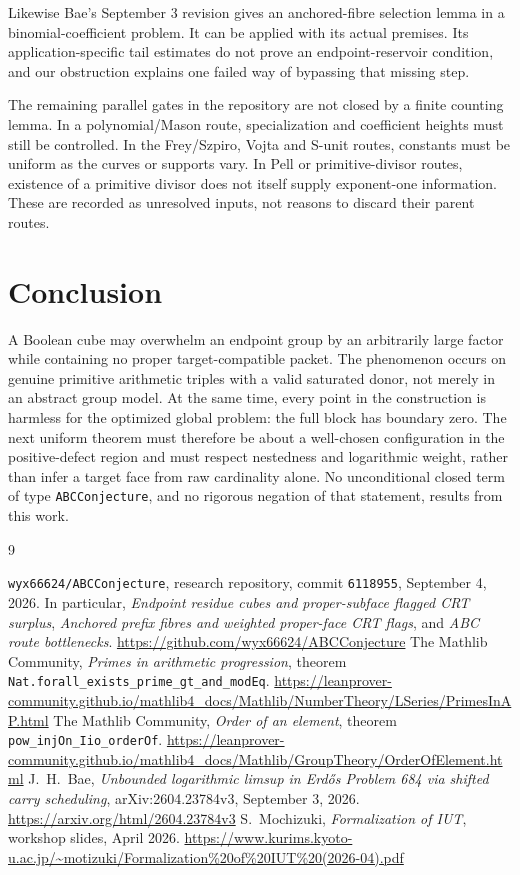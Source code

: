 \documentclass[11pt,a4paper]{article}
\theoremstyle{definition}
\theoremstyle{remark}
\begin{document}
Likewise Bae's September 3 revision \cite{bae} gives an anchored-fibre
selection lemma in a binomial-coefficient problem. It can be applied with
its actual premises. Its application-specific tail estimates do not prove
an endpoint-reservoir condition, and our obstruction explains one failed
way of bypassing that missing step.

The remaining parallel gates in the repository are not closed by a finite
counting lemma. In a polynomial/Mason route, specialization and coefficient
heights must still be controlled. In the Frey/Szpiro, Vojta and S-unit routes,
constants must be uniform as the curves or supports vary. In Pell or
primitive-divisor routes, existence of a primitive divisor does not itself
supply exponent-one information. These are recorded as unresolved inputs,
not reasons to discard their parent routes.

\section{Conclusion}
A Boolean cube may overwhelm an endpoint group by an arbitrarily large
factor while containing no proper target-compatible packet. The phenomenon
occurs on genuine primitive arithmetic triples with a valid saturated donor,
not merely in an abstract group model. At the same time, every point in the
construction is harmless for the optimized global problem: the full block
has boundary zero. The next uniform theorem must therefore be about a
well-chosen configuration in the positive-defect region and must respect
nestedness and logarithmic weight, rather than infer a target face from raw
cardinality alone. No unconditional closed term of type
\texttt{ABCConjecture}, and no rigorous negation of that statement, results
from this work.

\begin{thebibliography}{9}
\raggedright
{} \texttt{wyx66624/ABCConjecture}, research repository,
commit \texttt{6118955}, September 4, 2026.
In particular, \emph{Endpoint residue cubes and proper-subface flagged CRT
surplus}, \emph{Anchored prefix fibres and weighted proper-face CRT flags},
and \emph{ABC route bottlenecks}.\newline
\url{https://github.com/wyx66624/ABCConjecture}
 The Mathlib Community, \emph{Primes in arithmetic
progression}, theorem \texttt{Nat.forall\_exists\_prime\_gt\_and\_modEq}.
\url{https://leanprover-community.github.io/mathlib4_docs/Mathlib/NumberTheory/LSeries/PrimesInAP.html}
 The Mathlib Community, \emph{Order of an element}, theorem
\texttt{pow\_injOn\_Iio\_orderOf}.
\url{https://leanprover-community.github.io/mathlib4_docs/Mathlib/GroupTheory/OrderOfElement.html}
 J.~H.~Bae, \emph{Unbounded logarithmic limsup in Erd\H{o}s
Problem 684 via shifted carry scheduling}, arXiv:2604.23784v3,
September 3, 2026. \url{https://arxiv.org/html/2604.23784v3}
 S.~Mochizuki, \emph{Formalization of IUT}, workshop slides,
April 2026. \url{https://www.kurims.kyoto-u.ac.jp/~motizuki/Formalization%20of%20IUT%20(2026-04).pdf}
\end{thebibliography}
\end{document}
